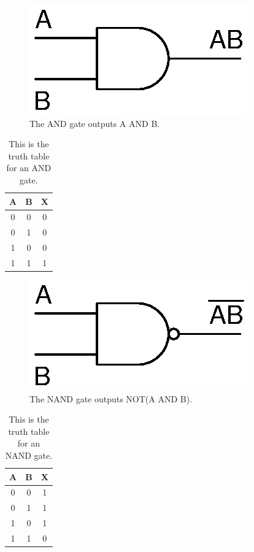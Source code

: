 \begin{figure}[!htb]
	\centering
	\includegraphics[scale=0.7]{logic/AND.eps}
	\caption{The AND gate outputs A AND B.}
	\label{fig:andgate}
\end{figure} 

\begin{table}[!ht]
	\centering
	\begin{tabular}{| c | c | c |}
		\hline
		A & B & X \\ 
		\hline
		0 & 0 & 0 \\ \hline
		0 & 1 & 0 \\ \hline
		1 & 0 & 0 \\ \hline
		1 & 1 & 1 \\ \hline
	\end{tabular}
	\caption{This is the truth table for an AND gate.}
	\label{table:andgate}
\end{table}

\begin{figure}[!htb]
	\centering
	\includegraphics[scale=0.7]{logic/NAND.eps}
	\caption{The NAND gate outputs NOT(A AND B).}
	\label{fig:nandgate}
\end{figure} 

\begin{table}[!ht]
	\centering
	\begin{tabular}{| c | c | c |}
		\hline
		A & B & X \\ 
		\hline
		0 & 0 & 1 \\ \hline
		0 & 1 & 1 \\ \hline
		1 & 0 & 1 \\ \hline
		1 & 1 & 0 \\ \hline
	\end{tabular}
	\caption{This is the truth table for an NAND gate.}
	\label{table:nandgate}
\end{table}

